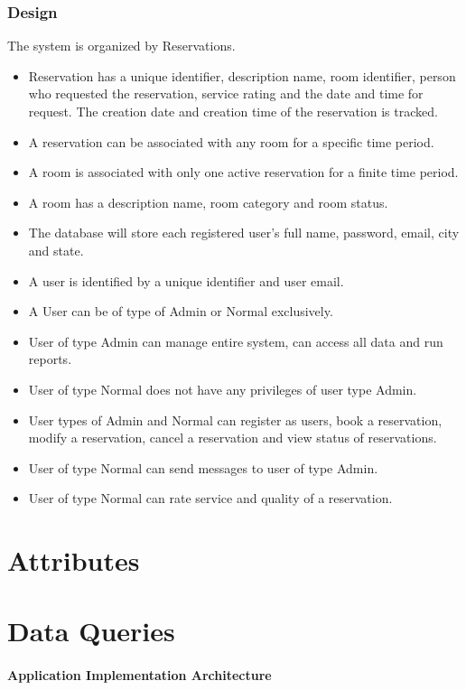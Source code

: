 \documentclass[11pt]{report}
\begin{document}
\subsubsection{Design}
The system is organized by Reservations. 
\begin{itemize}
\item Reservation has a unique identifier, description name, room identifier, person who requested the reservation, service rating and the date and time for request. The creation date and creation time of the reservation is tracked. \item A reservation can be associated with any room for a specific time period.
\item A room is associated with only one active reservation for a finite time period.
\item A room has a description name, room category and room status.
\item The database will store each registered user's full name, password, email, city and state.
\item A user is identified by a unique identifier and user email.
\item A User can be of type of Admin or Normal exclusively.
\item User of type Admin can manage entire system, can access all data and run reports.
\item User of type Normal does not have any privileges of user type Admin.
\item User types of Admin and Normal can register as users, book a reservation, modify a reservation, cancel a reservation and view status of reservations.
\item User of type Normal can send messages to user of type Admin.
\item User of type Normal can rate service and quality of a reservation.
\end{itemize}



\section*{Attributes}
\section*{Data Queries}
\paragraph{Application Implementation Architecture}
\end{document}
